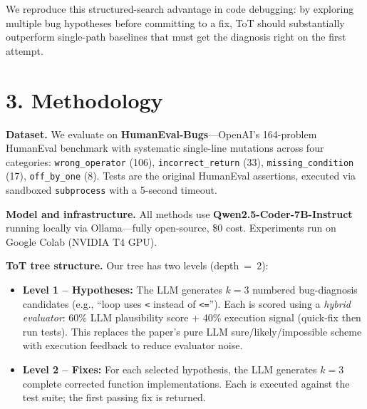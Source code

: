 \documentclass[11pt,letterpaper]{article}
\begin{document}
We reproduce this structured-search advantage in code debugging: by exploring multiple
bug hypotheses before committing to a fix, ToT should substantially outperform single-path
baselines that must get the diagnosis right on the first attempt.

\section*{3. Methodology}

\textbf{Dataset.} We evaluate on \textbf{HumanEval-Bugs}---OpenAI's 164-problem HumanEval
benchmark with systematic single-line mutations across four categories:
\texttt{wrong\_operator} (106), \texttt{incorrect\_return} (33), \texttt{missing\_condition} (17),
\texttt{off\_by\_one} (8). Tests are the original HumanEval assertions, executed via sandboxed
\texttt{subprocess} with a 5-second timeout.

\textbf{Model and infrastructure.} All methods use \textbf{Qwen2.5-Coder-7B-Instruct} running
locally via Ollama---fully open-source, \$0 cost. Experiments run on Google Colab (NVIDIA T4 GPU).

\textbf{ToT tree structure.} Our tree has two levels (depth~=~2):
\begin{itemize}[noitemsep,topsep=1pt]
  \item \textbf{Level 1 -- Hypotheses:} The LLM generates $k{=}3$ numbered bug-diagnosis candidates
        (e.g., ``loop uses \texttt{<} instead of \texttt{<=}''). Each is scored using a
        \emph{hybrid evaluator}: 60\% LLM plausibility score + 40\% execution signal (quick-fix
        then run tests). This replaces the paper's pure LLM sure/likely/impossible scheme with
        execution feedback to reduce evaluator noise.
  \item \textbf{Level 2 -- Fixes:} For each selected hypothesis, the LLM generates $k{=}3$
        complete corrected function implementations. Each is executed against the test suite;
        the first passing fix is returned.
\end{itemize}
\end{document}
